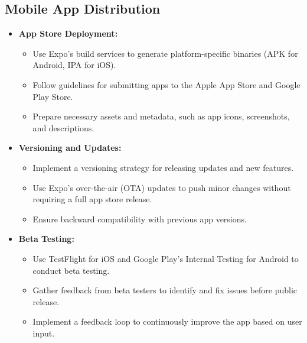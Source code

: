 \subsection{Mobile App Distribution}
\begin{itemize}[leftmargin=*]
    \item \textbf{App Store Deployment:}
    \begin{itemize}
        \item Use Expo's build services to generate platform-specific binaries (APK for Android, IPA for iOS).
        \item Follow guidelines for submitting apps to the Apple App Store and Google Play Store.
        \item Prepare necessary assets and metadata, such as app icons, screenshots, and descriptions.
    \end{itemize}
    
    \item \textbf{Versioning and Updates:}
    \begin{itemize}
        \item Implement a versioning strategy for releasing updates and new features.
        \item Use Expo's over-the-air (OTA) updates to push minor changes without requiring a full app store release.
        \item Ensure backward compatibility with previous app versions.
    \end{itemize}
    
    \item \textbf{Beta Testing:}
    \begin{itemize}
        \item Use TestFlight for iOS and Google Play's Internal Testing for Android to conduct beta testing.
        \item Gather feedback from beta testers to identify and fix issues before public release.
        \item Implement a feedback loop to continuously improve the app based on user input.
    \end{itemize}
\end{itemize}

